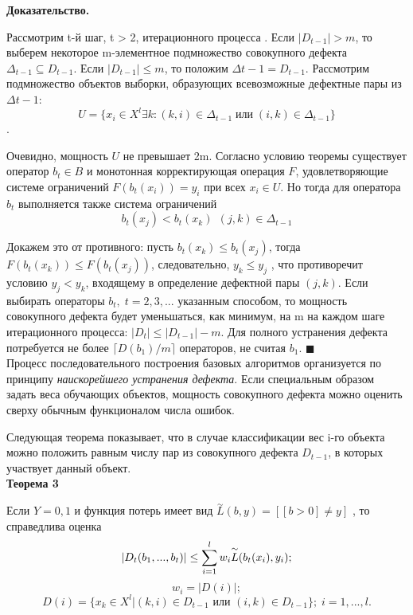 \textbf{Доказательство.}

Рассмотрим t-й шаг, t > 2, итерационного процесса . Если $\vert D_{t-1}\vert > m$,
то выберем некоторое m-элементное подмножество совокупного дефекта $\Delta_{t-1} \subseteq D_{t-1}$.
Если $\vert D_{t-1}\vert \leq m$, то положим $\Delta{t-1} = D_{t-1}$. Рассмотрим подмножество объектов
выборки, образующих всевозможные дефектные пары из $\Delta{t-1}$:
\[ U = \lbrace x_i \in X^l \exists k : (k, i) \in \Delta_{t-1} \; \text{или} \; (i, k) \in \Delta_{t-1} \rbrace\].

Очевидно, мощность $U$ не превышает 2m. Согласно условию теоремы существует оператор $b_t \in B$ и монотонная корректирующая операция $F$, удовлетворяющие системе
ограничений $F(b_t(x_i)) = y_i$ при всех $x_i \in U$. Но тогда для оператора $b_t$ выполняется
также система ограничений
\[ b_t(x_j) < b_t(x_k) \; \, (j, k) \in \Delta_{t-1}\]


Докажем это от противного: пусть $b_t(x_k) \leq b_t(x_j )$, тогда $F(b_t(x_k)) \leq F(b_t(x_j ))$, следовательно, $y_k \leq y_j$
, что противоречит условию $y_j < y_k$, входящему в определение
дефектной пары $(j, k)$.
Если выбирать операторы $b_t , \; t = 2, 3, . . .$ указанным способом, то мощность
совокупного дефекта будет уменьшаться, как минимум, на m на каждом шаге итерационного процесса: $\vert D_t \vert \leq \vert D_{t-1}\vert -m$. Для полного устранения дефекта потребуется не более $\lceil D(b_1)/m\rceil$
операторов, не считая $b_1$. $\blacksquare$
\\

Процесс последовательного построения базовых алгоритмов организуется
по принципу \textit{наискорейшего устранения дефекта}.
Если специальным образом задать веса
обучающих объектов, мощность совокупного дефекта можно оценить сверху
обычным функционалом числа ошибок.

Следующая теорема показывает, что в случае классификации вес i-го объекта
можно положить равным числу пар из совокупного дефекта $D_{t-1}$, в которых участвует данный объект.\\

\textbf{Теорема 3} 

Если $Y = {0, 1}$ и функция потерь имеет вид $\overset{\sim}{L}(b, y) =[[b > 0]\neq y]$ , то справедлива оценка \[\vert D_t(b_1, . . . , b_t)\vert \leq \operatornamewithlimits{\sum}^l_{i=1} w_i \overset{\sim}{L} (b_t(x_i), y_i); \]
\[w_i = \vert D(i)\vert ;\]
\[D(i) = \lbrace x_k \in X^l \vert (k, i) \in D_{t-1} \text{ или } (i, k) \in D_{t-1} \rbrace; \; i = 1, . . . , l.\]

